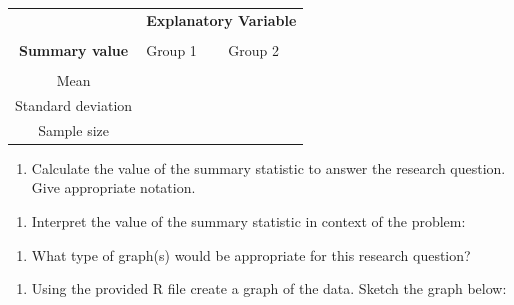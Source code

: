 \documentclass[
]{report}
\providecommand{\tightlist}{%
  \setlength{\itemsep}{0pt}\setlength{\parskip}{0pt}}
\begin{document}
\begingroup
\setlength{\tabcolsep}{14pt}
\renewcommand{\arraystretch}{2}
\begin{center}
\begin{tabular}{|c|p{1in}|p{1in}|}
\hline
 & \multicolumn{2}{|c|}{\textbf{Explanatory Variable}} \\
 & \multicolumn{2}{|c|}{ } \\ \hline
\textbf{Summary value} & Group 1 & Group 2 \\
 & & \\ \hline
 Mean & & \\ \hline
 Standard deviation & & \\ \hline
 Sample size & & \\ \hline
\end{tabular}
\end{center}
\endgroup

\begin{enumerate}
\def\labelenumi{\alph{enumi}.}
\setcounter{enumi}{3}
\tightlist
\item
  Calculate the value of the summary statistic to answer the research question. Give appropriate notation.
\end{enumerate}

\newpage

\begin{enumerate}
\def\labelenumi{\alph{enumi}.}
\setcounter{enumi}{4}
\tightlist
\item
  Interpret the value of the summary statistic in context of the problem:
\end{enumerate}

\vspace{0.4in}

\begin{enumerate}
\def\labelenumi{\alph{enumi}.}
\setcounter{enumi}{5}
\tightlist
\item
  What type of graph(s) would be appropriate for this research question?
\end{enumerate}

\vspace{0.2in}

\begin{enumerate}
\def\labelenumi{\alph{enumi}.}
\setcounter{enumi}{6}
\tightlist
\item
  Using the provided R file create a graph of the data. Sketch the graph below:
\end{enumerate}

\vspace{2in}
\end{document}
